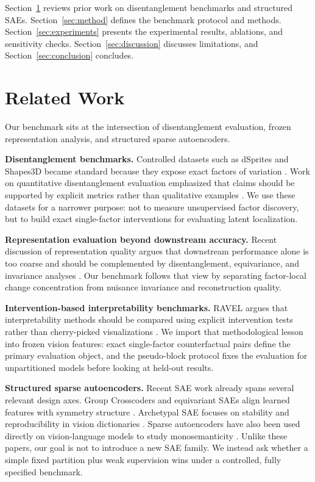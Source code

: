 \documentclass[10pt,twocolumn]{article}
\begin{document}
Section~\ref{sec:related} reviews prior work on disentanglement benchmarks and structured SAEs. Section~\ref{sec:method} defines the benchmark protocol and methods. Section~\ref{sec:experiments} presents the experimental results, ablations, and sensitivity checks. Section~\ref{sec:discussion} discusses limitations, and Section~\ref{sec:conclusion} concludes.

\section{Related Work}
\label{sec:related}
Our benchmark sits at the intersection of disentanglement evaluation, frozen representation analysis, and structured sparse autoencoders.

\textbf{Disentanglement benchmarks.} Controlled datasets such as dSprites and Shapes3D became standard because they expose exact factors of variation \citep{higgins2017betavae,burgess2018understanding,kim2018factorvae}. Work on quantitative disentanglement evaluation emphasized that claims should be supported by explicit metrics rather than qualitative examples \citep{eastwood2018framework,locatello2019challenging}. We use these datasets for a narrower purpose: not to measure unsupervised factor discovery, but to build exact single-factor interventions for evaluating latent localization.

\textbf{Representation evaluation beyond downstream accuracy.} Recent discussion of representation quality argues that downstream performance alone is too coarse and should be complemented by disentanglement, equivariance, and invariance analyses \citep{christos2025towards}. Our benchmark follows that view by separating factor-local change concentration from nuisance invariance and reconstruction quality.

\textbf{Intervention-based interpretability benchmarks.} RAVEL argues that interpretability methods should be compared using explicit intervention tests rather than cherry-picked visualizations \citep{jing2024ravel}. We import that methodological lesson into frozen vision features: exact single-factor counterfactual pairs define the primary evaluation object, and the pseudo-block protocol fixes the evaluation for unpartitioned models before looking at held-out results.

\textbf{Structured sparse autoencoders.} Recent SAE work already spans several relevant design axes. Group Crosscoders and equivariant SAEs align learned features with symmetry structure \citep{liv2024group,ege2025group}. Archetypal SAE focuses on stability and reproducibility in vision dictionaries \citep{thomas2025archetypal}. Sparse autoencoders have also been used directly on vision-language models to study monosemanticity \citep{mateusz2025sparse}. Unlike these papers, our goal is not to introduce a new SAE family. We instead ask whether a simple fixed partition plus weak supervision wins under a controlled, fully specified benchmark.
\end{document}
